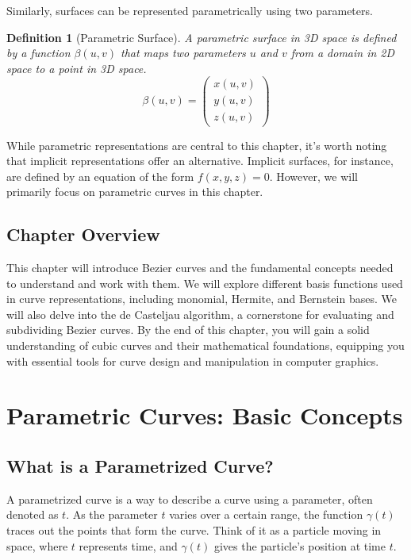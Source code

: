\documentclass{article}
\newtheorem{definition}{Definition}
\begin{document}
Similarly, surfaces can be represented parametrically using two parameters.

\begin{definition}[Parametric Surface]
A parametric surface in 3D space is defined by a function \(\beta(u, v)\) that maps two parameters \(u\) and \(v\) from a domain in 2D space to a point in 3D space.
\[ \beta(u, v) = \begin{pmatrix} x(u, v) \\ y(u, v) \\ z(u, v) \end{pmatrix} \]
\end{definition}

While parametric representations are central to this chapter, it's worth noting that implicit representations offer an alternative. Implicit surfaces, for instance, are defined by an equation of the form \(f(x, y, z) = 0\). However, we will primarily focus on parametric curves in this chapter.

\subsection{Chapter Overview}

This chapter will introduce Bezier curves and the fundamental concepts needed to understand and work with them. We will explore different basis functions used in curve representations, including monomial, Hermite, and Bernstein bases. We will also delve into the de Casteljau algorithm, a cornerstone for evaluating and subdividing Bezier curves. By the end of this chapter, you will gain a solid understanding of cubic curves and their mathematical foundations, equipping you with essential tools for curve design and manipulation in computer graphics.

\section{Parametric Curves: Basic Concepts}

\subsection{What is a Parametrized Curve?}

A parametrized curve is a way to describe a curve using a parameter, often denoted as \(t\). As the parameter \(t\) varies over a certain range, the function \(\gamma(t)\) traces out the points that form the curve.  Think of it as a particle moving in space, where \(t\) represents time, and \(\gamma(t)\) gives the particle's position at time \(t\).
\end{document}
